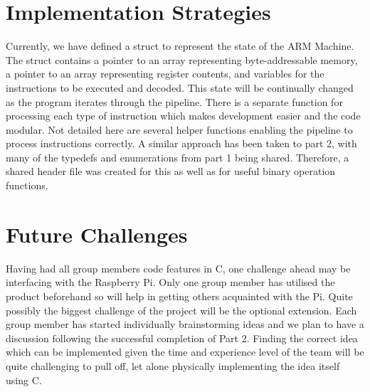 \documentclass[11pt]{article}
\begin{document}
\newpage

\section{Implementation Strategies}

Currently, we have defined a struct to represent the state of the ARM Machine. The struct contains a pointer to an array representing byte-addressable memory, a pointer to an array representing register contents, and variables for the instructions to be executed and decoded. This state will be continually changed as the program iterates through the pipeline. There is a separate function for processing each type of instruction which makes development easier and the code modular. Not detailed here are several helper functions enabling the pipeline to process instructions correctly. A similar approach has been taken to part 2, with many of the typedefs and enumerations from part 1 being shared. Therefore, a shared header file was created for this as well as for useful binary operation functions.

\section{Future Challenges}

Having had all group members code features in C, one challenge ahead may be interfacing with the Raspberry Pi. Only one group member has utilised the product beforehand so will help in getting others acquainted with the Pi. Quite possibly the biggest challenge of the project will be the optional extension. Each group member has started individually brainstorming ideas and we plan to have a discussion following the successful completion of Part 2. Finding the correct idea which can be implemented given the time and experience level of the team will be quite challenging to pull off, let alone physically implementing the idea itself using C.
\end{document}
